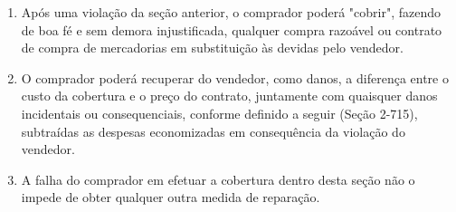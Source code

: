 \documentclass[a5paper,10pt]{book}
\begin{document}
\begin{enumerate}[label=(\arabic*)]
	\item Após uma violação da seção anterior, o comprador poderá "cobrir", fazendo de boa fé e sem demora injustificada, qualquer compra razoável ou contrato de compra de mercadorias em substituição às devidas pelo vendedor.
	\item O comprador poderá recuperar do vendedor, como danos, a diferença entre o custo da cobertura e o preço do contrato, juntamente com quaisquer danos incidentais ou consequenciais, conforme definido a seguir (Seção 2-715), subtraídas as despesas economizadas em consequência da violação do vendedor.
	\item A falha do comprador em efetuar a cobertura dentro desta seção não o impede de obter qualquer outra medida de reparação.
\end{enumerate}
\end{document}
